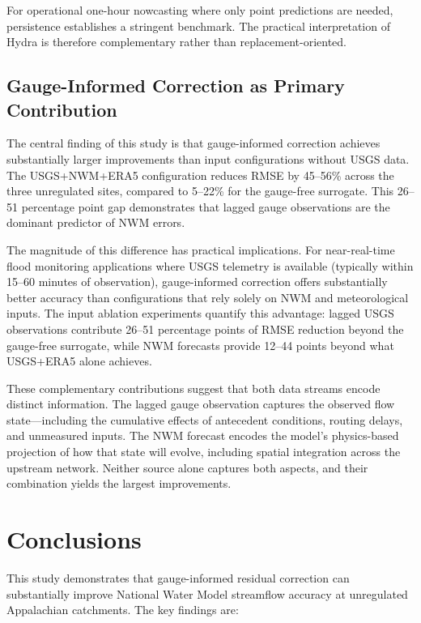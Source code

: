 \documentclass[draft]{agujournal2019}
\begin{document}
For operational one-hour nowcasting where only point predictions are needed, persistence establishes a stringent benchmark. The practical interpretation of Hydra is therefore complementary rather than replacement-oriented.

\subsection{Gauge-Informed Correction as Primary Contribution}

The central finding of this study is that gauge-informed correction achieves substantially larger improvements than input configurations without USGS data. The USGS+NWM+ERA5 configuration reduces RMSE by 45--56\% across the three unregulated sites, compared to 5--22\% for the gauge-free surrogate. This 26--51 percentage point gap demonstrates that lagged gauge observations are the dominant predictor of NWM errors.

The magnitude of this difference has practical implications. For near-real-time flood monitoring applications where USGS telemetry is available (typically within 15--60 minutes of observation), gauge-informed correction offers substantially better accuracy than configurations that rely solely on NWM and meteorological inputs. The input ablation experiments quantify this advantage: lagged USGS observations contribute 26--51 percentage points of RMSE reduction beyond the gauge-free surrogate, while NWM forecasts provide 12--44 points beyond what USGS+ERA5 alone achieves.

These complementary contributions suggest that both data streams encode distinct information. The lagged gauge observation captures the observed flow state---including the cumulative effects of antecedent conditions, routing delays, and unmeasured inputs. The NWM forecast encodes the model's physics-based projection of how that state will evolve, including spatial integration across the upstream network. Neither source alone captures both aspects, and their combination yields the largest improvements.


\section{Conclusions}

This study demonstrates that gauge-informed residual correction can substantially improve National Water Model streamflow accuracy at unregulated Appalachian catchments. The key findings are:
\end{document}
